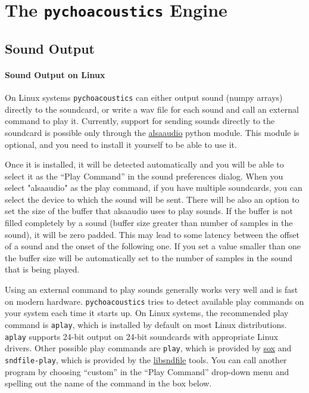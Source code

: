 \chapter{The \texttt{pychoacoustics} Engine}


\section{Sound Output}
\label{sec:sound_output}

\subsubsection{Sound Output on Linux}
On Linux systems \texttt{pychoacoustics} can either output sound (numpy arrays) directly to the soundcard, or
write a wav file for each sound and call an external command to play it. Currently, support for sending
sounds directly to the soundcard is possible only through the 
\href{http://pyalsaaudio.sourceforge.net/}{alsaaudio} python module.
This module is optional, and you need to install it yourself to be able to use it.

Once it is installed, it will be detected automatically and you will be able to 
select it as the ``Play Command'' in the sound preferences dialog. When you select
"alsaaudio" as the play command, if you have multiple soundcards, you can select the 
device to which the sound will be sent. There will be also an option to set the size
of the buffer that alsaaudio uses to play sounds. If the buffer is not filled completely
by a sound (buffer size greater than number of samples in the sound), it will be zero
padded. This may lead to some latency between the offset of a sound and the onset of the
following one. If you set a value smaller than one the buffer size will be automatically 
set to the number of samples in the sound that is being played.


Using an external command to play sounds generally works very well and is fast on modern hardware.
\texttt{pychoacoustics} tries to detect available play commands on your system each time it starts up.
On Linux systems, the recommended play command is \texttt{aplay}, which is installed by default on most Linux
distributions. \texttt{aplay} supports 24-bit output on 24-bit soundcards with appropriate Linux drivers.
Other possible play commands are \texttt{play}, which is provided by \href{http://sox.sourceforge.net/}{sox} and \texttt{sndfile-play}, which
is provided by the \href{http://www.mega-nerd.com/libsndfile/}{libsndfile} tools. You can call another program by choosing ``custom'' in the
``Play Command'' drop-down menu and spelling out the name of the command in the box below.

